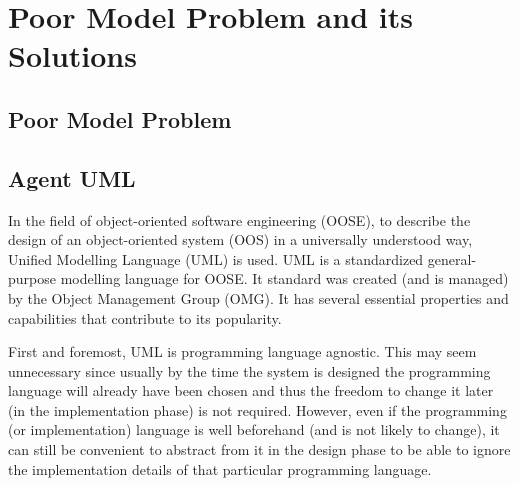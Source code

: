 
\chapter{Poor Model Problem and its Solutions}

\section{Poor Model Problem}


\section{Agent UML}


In the field of object-oriented software engineering (OOSE), to describe the design of an object-oriented system (OOS) in a universally understood way, Unified Modelling Language (UML) is used.
UML is a standardized general-purpose modelling language for OOSE.
It standard was created (and is managed) by the Object Management Group (OMG).
It has several essential properties and capabilities that contribute to its popularity.

First and foremost, UML is programming language agnostic.
This may seem unnecessary since usually by the time the system is designed the programming language will already have been chosen and thus the freedom to change it later (in the implementation phase) is not required.
However, even if the programming (or implementation) language is well beforehand (and is not likely to change), it can still be convenient to abstract from it in the design phase to be able to ignore the implementation details of that particular programming language.

